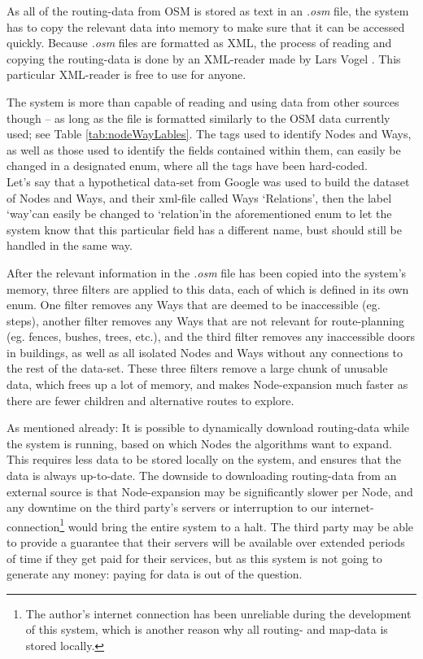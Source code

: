 As all of the routing-data from OSM is stored as text in an \textit{.osm} file, the system has to copy the relevant data into memory to make sure that it can be accessed quickly. Because \textit{.osm} files are formatted as XML, the process of reading and copying the routing-data is done by an XML-reader made by Lars Vogel \cite{Vogella-XML}. This particular XML-reader is free to use for anyone.

The system is more than capable of reading and using data from other sources though -- as long as the file is formatted similarly to the OSM data currently used; see Table \ref{tab:nodeWayLables}. The tags used to identify Nodes and Ways, as well as those used to identify the fields contained within them, can easily be changed in a designated enum, where all the tags have been hard-coded.\\
Let's say that a hypothetical data-set from Google was used to build the dataset of Nodes and Ways, and their xml-file called Ways \textquoteleft Relations\textquoteright, then the label \textquoteleft way\textquoteright can easily be changed to \textquoteleft relation\textquoteright in the aforementioned enum to let the system know that this particular field has a different name, bust should still be handled in the same way.

After the relevant information in the \textit{.osm} file has been copied into the system's memory, three filters are applied to this data, each of which is defined in its own enum. One filter removes any Ways that are deemed to be inaccessible (eg. steps), another filter removes any Ways that are not relevant for route-planning (eg. fences, bushes, trees, etc.), and the third filter removes any inaccessible doors in buildings, as well as all isolated Nodes and Ways without any connections to the rest of the data-set. These three filters remove a large chunk of unusable data, which frees up a lot of memory, and makes Node-expansion much faster as there are fewer children and alternative routes to explore.

As mentioned already: It is possible to dynamically download routing-data while the system is running, based on which Nodes the algorithms want to expand. This requires less data to be stored locally on the system, and ensures that the data is always up-to-date. The downside to downloading routing-data from an external source is that Node-expansion may be significantly slower per Node, and any downtime on the third party's servers or interruption to our internet-connection\footnote{The author's internet connection has been unreliable during the development of this system, which is another reason why all routing- and map-data is stored locally.} would bring the entire system to a halt. The third party may be able to provide a guarantee that their servers will be available over extended periods of time if they get paid for their services, but as this system is not going to generate any money: paying for data is out of the question.



